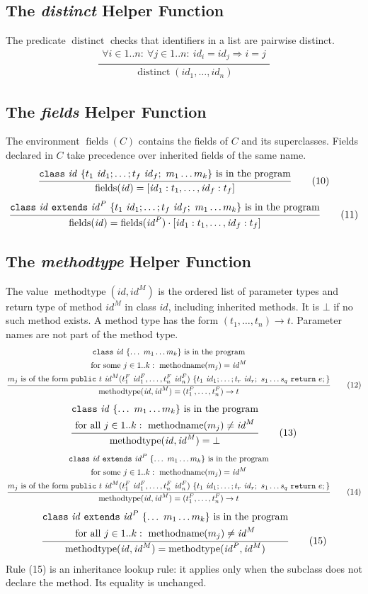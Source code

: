 \documentclass[11pt,a4paper]{article}
\newcommand{\kw}[1]{\text{\texttt{#1}}}
\newcommand{\mt}{\operatorname{methodtype}}
\newcommand{\mn}{\operatorname{methodname}}
\newcommand{\fld}{\operatorname{fields}}
\newcommand{\dist}{\operatorname{distinct}}
\newcommand{\id}{\mathit{id}}
\newcommand{\ruleeq}[3]{\begin{equation}\frac{\begin{gathered}#2\end{gathered}}{\begin{gathered}#3\end{gathered}}\tag{#1}\end{equation}}
\newcommand{\method}{\kw{public}\ t\ \id^M(t_1^F\ \id_1^F,\ldots,t_n^F\ \id_n^F)\ \{t_1\ \id_1;\ldots;t_r\ \id_r;\ s_1\ldots s_q\ \kw{return}\ e;\}}
\begin{document}
\subsection{The \textit{distinct} Helper Function}
The predicate $\dist$ checks that identifiers in a list are pairwise distinct.
\ruleeq{9}{\forall i\in1..n:\ \forall j\in1..n:\ \id_i=\id_j\Rightarrow i=j}
{\dist(\id_1,\ldots,\id_n)}
\subsection{The \textit{fields} Helper Function}
The environment $\fld(C)$ contains the fields of $C$ and its superclasses.
Fields declared in $C$ take precedence over inherited fields of the same name.
\ruleeq{10}{\kw{class}\ \id\ \{t_1\ \id_1;\ldots;t_f\ \id_f;\ m_1\ldots m_k\}\ \text{is in the program}}
{\fld(\id)=[\id_1:t_1,\ldots,\id_f:t_f]}
\ruleeq{11}{\kw{class}\ \id\ \kw{extends}\ \id^P\ \{t_1\ \id_1;\ldots;t_f\ \id_f;\ m_1\ldots m_k\}\ \text{is in the program}}
{\fld(\id)=\fld(\id^P)\cdot[\id_1:t_1,\ldots,\id_f:t_f]}

\newpage
\subsection{The \textit{methodtype} Helper Function}
The value $\mt(\id,\id^M)$ is the ordered list of parameter types and return
type of method $\id^M$ in class $\id$, including inherited methods. It is
$\bot$ if no such method exists. A method type has the form
$(t_1,\ldots,t_n)\to t$. Parameter names are not part of the method type.
\begingroup\small
\ruleeq{12}{\kw{class}\ \id\ \{\ldots\ m_1\ldots m_k\}\ \text{is in the program}\\
\text{for some }j\in1..k:\ \mn(m_j)=\id^M\\
m_j\text{ is of the form }\method}
{\mt(\id,\id^M)=(t_1^F,\ldots,t_n^F)\to t}
\ruleeq{13}{\kw{class}\ \id\ \{\ldots\ m_1\ldots m_k\}\ \text{is in the program}\\
\text{for all }j\in1..k:\ \mn(m_j)\neq\id^M}
{\mt(\id,\id^M)=\bot}
\ruleeq{14}{\kw{class}\ \id\ \kw{extends}\ \id^P\ \{\ldots\ m_1\ldots m_k\}\ \text{is in the program}\\
\text{for some }j\in1..k:\ \mn(m_j)=\id^M\\
m_j\text{ is of the form }\method}
{\mt(\id,\id^M)=(t_1^F,\ldots,t_n^F)\to t}
\ruleeq{15}{\kw{class}\ \id\ \kw{extends}\ \id^P\ \{\ldots\ m_1\ldots m_k\}\ \text{is in the program}\\
\text{for all }j\in1..k:\ \mn(m_j)\neq\id^M}
{\mt(\id,\id^M)=\mt(\id^P,\id^M)}
\endgroup
Rule (15) is an inheritance lookup rule: it applies only when the subclass does
not declare the method. Its equality is unchanged.
\end{document}
